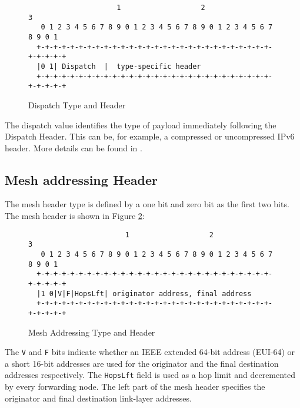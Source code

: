 \documentclass[12pt, titlepage, a4paper]{report}
\newenvironment{mylisting}
{\begin{list}{}{\setlength{\leftmargin}{1em}}\item\footnotesize}
{\end{list}}
\begin{document}
\begin{figure}[htp]
\centering
\begin{mylisting}
\begin{verbatim}
                     1                   2                   3
   0 1 2 3 4 5 6 7 8 9 0 1 2 3 4 5 6 7 8 9 0 1 2 3 4 5 6 7 8 9 0 1
  +-+-+-+-+-+-+-+-+-+-+-+-+-+-+-+-+-+-+-+-+-+-+-+-+-+-+-+-+-+-+-+-+
  |0 1| Dispatch  |  type-specific header
  +-+-+-+-+-+-+-+-+-+-+-+-+-+-+-+-+-+-+-+-+-+-+-+-+-+-+-+-+-+-+-+-+
\end{verbatim}
\end{mylisting}
\caption{Dispatch Type and Header}\label{fig:dispatch.header}
\end{figure}
The dispatch value identifies the type of payload immediately following the Dispatch Header. This can  be, for example, a compressed or uncompressed IPv6 header. More details can be found in \cite{rfc4944}.

\subsection{Mesh addressing Header}\label{subsec:mesh.header}

The mesh header type is defined by a one bit and zero bit as the first two bits. The mesh header is shown in Figure \ref{fig:mesh.header}:
\begin{figure}[htp]
\centering
\begin{mylisting}
\begin{verbatim}
                       1                   2                   3
   0 1 2 3 4 5 6 7 8 9 0 1 2 3 4 5 6 7 8 9 0 1 2 3 4 5 6 7 8 9 0 1
  +-+-+-+-+-+-+-+-+-+-+-+-+-+-+-+-+-+-+-+-+-+-+-+-+-+-+-+-+-+-+-+-+
  |1 0|V|F|HopsLft| originator address, final address
  +-+-+-+-+-+-+-+-+-+-+-+-+-+-+-+-+-+-+-+-+-+-+-+-+-+-+-+-+-+-+-+-+
\end{verbatim}
\end{mylisting}
\caption{Mesh Addressing Type and Header}\label{fig:mesh.header}
\end{figure}

The \texttt{V} and \texttt{F} bits indicate whether an IEEE extended 64-bit address (EUI-64) or a short 16-bit addresses are used for the originator and the final destination addresses respectively. The \texttt{HopsLft} field is used as a hop limit and decremented by every forwarding node. The left part of the mesh header specifies the originator and final destination link-layer addresses.
\end{document}
